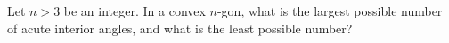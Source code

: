 Let $n>3$ be an integer. In a convex $n$-gon, what is the largest possible number of acute interior angles, and what is the least possible number?
